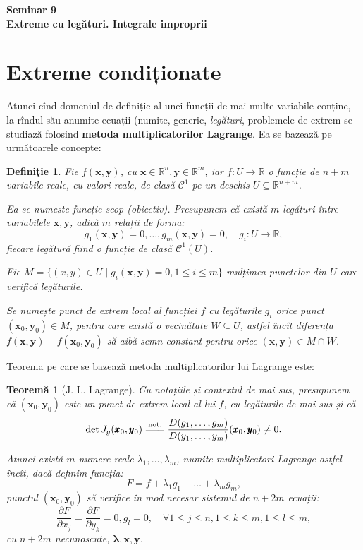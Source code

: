 \documentclass[11pt,a4paper]{article}
\newcommand\kal{\mathcal}
\newcommand\seq{\subseteq}
\newcommand\RR{\mathbb{R}}
\theoremstyle{dotless}
\newtheorem{theorem}{Teorem\u{a}}[section]
\theoremstyle{dotlessdr}
\newtheorem{definition}{Defini\c{t}ie}[section]
\begin{document}
\begin{center}
  {\large\textbf{
      Seminar 9 \\
      Extreme cu legături. Integrale improprii
    }}
\end{center}

\vspace{1cm}

\section{Extreme condiționate}
\label{sec:extreme-cond}

Atunci cînd domeniul de definiție al unei funcții de mai multe variabile conține,
la rîndul său anumite ecuații (numite, generic, \emph{legături}, problemele de
extrem se studiază folosind \textbf{metoda multiplicatorilor Lagrange}. Ea se
bazează pe următoarele concepte:

\begin{definition}\label{def:fc-scop}
  Fie $f(\pmb{x}, \pmb{y})$, cu $\pmb{x} \in \RR^n, \pmb{y} \in \RR^m$,
  iar $f : U \to \RR$ o funcție de $n + m$ variabile reale, cu valori reale, de
  clasă $\kal{C}^1$ pe un deschis $U \seq \RR^{n+m}$.

  Ea se numește \emph{funcție-scop (obiectiv)}. Presupunem că există $m$
  legături între variabilele $\pmb{x}, \pmb{y}$, adică $m$ relații de forma:
  \[
    g_1(\pmb{x}, \pmb{y}) = 0, \dots, g_m(\pmb{x}, \pmb{y}) = 0, \quad %
    g_i : U \to \RR,
  \]
  fiecare legătură fiind o funcție de clasă $\kal{C}^1(U)$.

  Fie $M = \{(x, y) \in U \mid g_i(\pmb{x}, \pmb{y}) = 0, 1 \leq i \leq m\}$
  mulțimea punctelor din $U$ care verifică legăturile.

  Se numește \emph{punct de extrem local al funcției $f$ cu legăturile $g_i$}
  orice punct $(\pmb{x}_0, \pmb{y}_0) \in M$, pentru care există o vecinătate
  $W \seq U$, astfel încît diferența $f(\pmb{x}, \pmb{y}) - f(\pmb{x}_0, \pmb{y}_0)$
  să aibă semn constant pentru orice $(\pmb{x}, \pmb{y}) \in M \cap W$.
\end{definition}

Teorema pe care se bazează metoda multiplicatorilor lui Lagrange este:

\begin{theorem}[J. L. Lagrange]\label{thm:lagr-mult}
  Cu notațiile și contextul de mai sus, presupunem că $(\pmb{x}_0, \pmb{y}_0)$
  este un punct de extrem local al lui $f$, cu legăturile de mai sus și că
  \[
    \det J_g(\pmb{x}_0, \pmb{y}_0) \stackrel{\text{not.}}{=\joinrel=\joinrel=} %
    \frac{D(g_1, \dots, g_m)}{D(y_1, \dots, y_m)} (\pmb{x}_0, \pmb{y}_0) \neq 0.
  \]

  Atunci există $m$ numere reale $\lambda_1, \dots, \lambda_m$, numite
  \emph{multiplicatori Lagrange} astfel încît, dacă definim funcția:
  \[
    F = f + \lambda_1 g_1 + \dots + \lambda_m g_m,
  \]
  punctul $(\pmb{x}_0, \pmb{y}_0)$ să verifice în mod necesar sistemul de
  $n + 2m$ ecuații:
  \[
    \frac{\partial F}{\partial x_j} = \frac{\partial F}{\partial y_k} = 0, %
    g_l = 0, \quad \forall 1 \leq j \leq n, 1 \leq k \leq m, 1 \leq l \leq m,
  \]
  cu $n + 2m$ necunoscute, $\pmb{\lambda}, \pmb{x}, \pmb{y}$.
\end{theorem}
\end{document}
